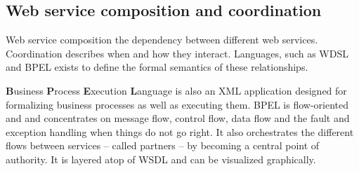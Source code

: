 \subsection{Web service composition and coordination}
Web service composition the dependency between different web services. Coordination describes when and how they interact. Languages, such as WDSL and BPEL exists to define the formal semantics of these relationships.

 \textbf{B}usiness \textbf{P}rocess \textbf{E}xecution \textbf{L}anguage is also an XML application designed for formalizing business processes as well as executing them. BPEL is flow-oriented and and concentrates on message flow, control flow, data flow and the fault and exception handling when things do not go right. It also orchestrates the different flows between services -- called partners -- by becoming a central point of authority. It is layered atop of WSDL and can be visualized graphically.



